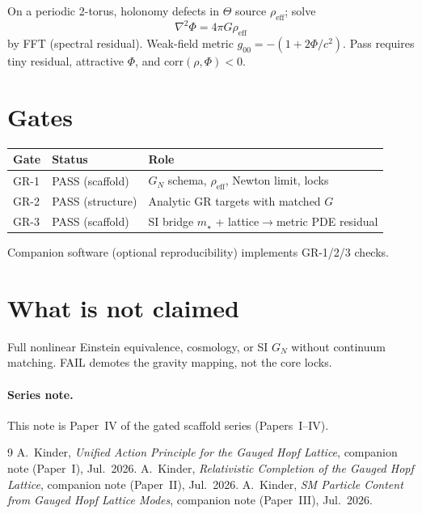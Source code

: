 \documentclass[11pt]{article}
\begin{document}
On a periodic 2-torus, holonomy defects in $\Theta$ source
$\rho_{\mathrm{eff}}$; solve
\begin{equation}
\nabla^{2}\Phi = 4\pi G\rho_{\mathrm{eff}}
\label{eq:poisson-lattice}
\end{equation}
by FFT (spectral residual). Weak-field metric
$g_{00}=-(1+2\Phi/c^{2})$. Pass requires tiny residual, attractive $\Phi$,
and $\mathrm{corr}(\rho,\Phi)<0$.

\section{Gates}

\begin{center}
\begin{tabular}{@{}llp{}@{}}
\hline
Gate & Status & Role \\
\hline
GR-1 & PASS (scaffold) & $G_N$ schema, $\rho_{\mathrm{eff}}$, Newton limit, locks \\
GR-2 & PASS (structure) & Analytic GR targets with matched $G$ \\
GR-3 & PASS (scaffold) & SI bridge $m_\star$ + lattice$\to$metric PDE residual \\
\hline
\end{tabular}
\end{center}

Companion software (optional reproducibility) implements GR-1/2/3 checks.

\section{What is not claimed}

Full nonlinear Einstein equivalence, cosmology, or SI $G_N$ without continuum matching.
FAIL demotes the gravity mapping, not the core locks.

\paragraph{Series note.}
This note is Paper~IV of the gated scaffold series (Papers~I--IV).

\begin{thebibliography}{9}
A.~Kinder, \emph{Unified Action Principle for the Gauged Hopf Lattice},
companion note (Paper~I), Jul.~2026.
A.~Kinder, \emph{Relativistic Completion of the Gauged Hopf Lattice},
companion note (Paper~II), Jul.~2026.
A.~Kinder, \emph{SM Particle Content from Gauged Hopf Lattice Modes},
companion note (Paper~III), Jul.~2026.
\end{thebibliography}
\end{document}
